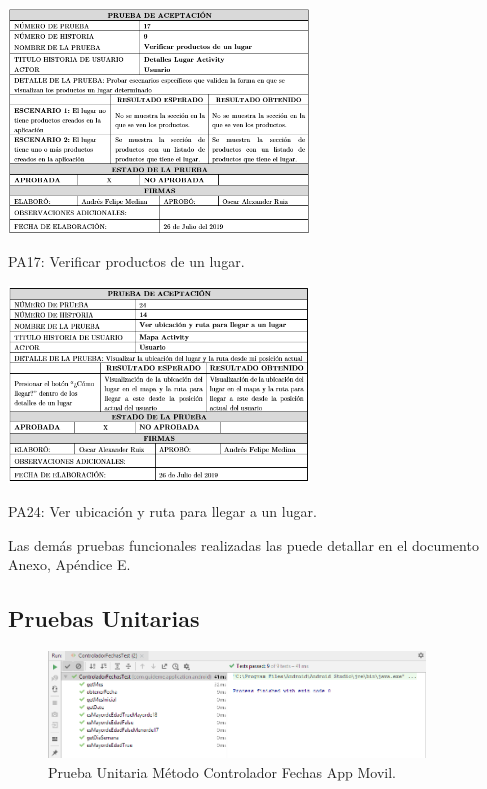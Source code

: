 \documentclass[12pt,letterpaper,openany]{book}
\begin{document}
\begin{table}[H]
\centering
\includegraphics[width=8cm]{./imagenes/PA/PA17}
\caption{PA17: Verificar productos de un lugar.}
\end{table}

\begin{table}[H]
\centering
\includegraphics[width=8cm]{./imagenes/PA/PA24}
\caption{PA24: Ver ubicación y ruta para llegar a un lugar.}
\end{table}

Las demás pruebas funcionales realizadas las puede detallar en el documento Anexo, Apéndice E.

\subsection{Pruebas Unitarias}
\begin{figure}[H]
\begin{center}
\includegraphics[width=10cm]{./imagenes/Test/ControladorFechasTest}
\caption{Prueba Unitaria Método Controlador Fechas App Movil.}
\end{center}
\end{figure}
\end{document}
